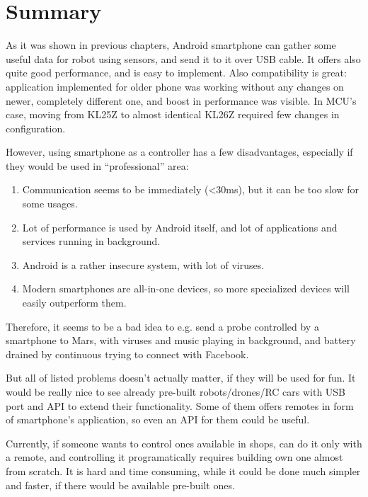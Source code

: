 \chapter{Summary}
As it was shown in previous chapters, Android smartphone can gather some useful
data for robot using sensors, and send it to it over USB cable.
It offers also quite good performance, and is easy to implement. 
Also compatibility is great: application implemented for older phone was working
without any changes on newer, completely different one, and boost in performance
was visible.
In MCU's case, moving from KL25Z to almost identical KL26Z required few changes
in configuration.

However, using smartphone as a controller has a few disadvantages, especially if
they would be used in ``professional'' area:
\begin{enumerate}
  \item Communication seems to be immediately (<30ms), but it can be too slow
  	for some usages.
  \item Lot of performance is used by Android itself, and lot of applications
  	and services running in background.
  \item Android is a rather insecure system, with lot of viruses.
  \item Modern smartphones are all-in-one devices, so more specialized devices
  	will easily outperform them.
\end{enumerate}
Therefore, it seems to be a bad idea to e.g. send a probe controlled by a
smartphone to Mars, with viruses and music playing in background, and battery
drained by continuous trying to connect with Facebook.

But all of listed problems doesn't actually matter, if they will be used for
fun.
It would be really nice to see already pre-built robots/drones/RC cars with USB
port and API to extend their functionality.
Some of them offers remotes in form of smartphone's application, so even an API
for them could be useful.

Currently, if someone wants to control ones available in shops, can do it only
with a remote, and controlling it programatically requires building own one
almost from scratch.
It is hard and time consuming, while it could be done much simpler and faster,
if there would be available pre-built ones.

